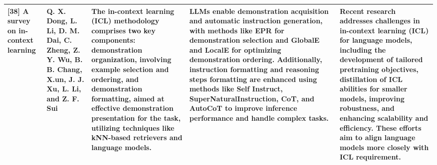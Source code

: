 \documentclass[conference]{IEEEtran}
\begin{document}
\begin{table}
\begin{center}
\begin{tabular}{ |p{2cm}|p{2cm}|p{4cm}|p{3cm}|p{4cm}| }
[38] A survey on in-context learning & Q. X. Dong, L. Li, D. M. Dai, C. Zheng, Z. Y. Wu, B. B. Chang, X.un, J. J. Xu, L. Li, and Z. F. Sui & The in-context learning (ICL) methodology comprises two key components: demonstration organization, involving example selection and ordering, and demonstration formatting, aimed at effective demonstration presentation for the task, utilizing techniques like kNN-based retrievers and language models. & LLMs enable demonstration acquisition and automatic instruction generation, with methods like EPR for demonstration selection and GlobalE and LocalE for optimizing demonstration ordering. Additionally, instruction formatting and reasoning steps formatting are enhanced using methods like Self Instruct, SuperNaturalInstruction, CoT, and AutoCoT to improve inference performance and handle complex tasks. & Recent research addresses challenges in in-context learning (ICL) for language models, including the development of tailored pretraining objectives, distillation of ICL abilities for smaller models, improving robustness, and enhancing scalability and efficiency. These efforts aim to align language models more closely with ICL requirement. \\
\hline
\end{tabular}
\end{center}
\end{table}
\end{document}
